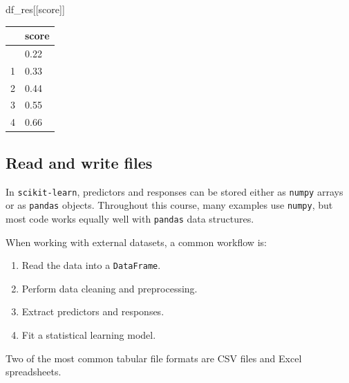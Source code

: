 \documentclass[
  letterpaper,
  DIV=11,
  numbers=noendperiod]{scrreprt}
\newenvironment{Shaded}{\begin{snugshade}}{\end{snugshade}}
\newcommand{\NormalTok}[1]{\textcolor[rgb]{0.00,0.23,0.31}{#1}}
\newcommand{\StringTok}[1]{\textcolor[rgb]{0.13,0.47,0.30}{#1}}
\newcounter{none} %
\providecommand{\tightlist}{%
  \setlength{\itemsep}{0pt}\setlength{\parskip}{0pt}}
\theoremstyle{definition}
\theoremstyle{definition}
\theoremstyle{plain}
\theoremstyle{plain}
\theoremstyle{remark}
\begin{document}
\begin{Shaded}
\begin{Highlighting}[]
\NormalTok{df\_res[[}\StringTok{\textquotesingle{}score\textquotesingle{}}\NormalTok{]]}
\end{Highlighting}
\end{Shaded}

{\def\LTcaptype{none} %
\begin{longtable}[]{@{}ll@{}}
\toprule\noalign{}
& score \\
\midrule\noalign{}
\endhead
\bottomrule\noalign{}
\endlastfoot
0 & 0.22 \\
1 & 0.33 \\
2 & 0.44 \\
3 & 0.55 \\
4 & 0.66 \\
\end{longtable}
}

\subsection{Read and write files}\label{read-and-write-files}

In \texttt{scikit-learn}, predictors and responses can be stored either
as \texttt{numpy} arrays or as \texttt{pandas} objects. Throughout this
course, many examples use \texttt{numpy}, but most code works equally
well with \texttt{pandas} data structures.

When working with external datasets, a common workflow is:

\begin{enumerate}
\def\labelenumi{\arabic{enumi}.}
\tightlist
\item
  Read the data into a \texttt{DataFrame}.
\item
  Perform data cleaning and preprocessing.
\item
  Extract predictors and responses.
\item
  Fit a statistical learning model.
\end{enumerate}

Two of the most common tabular file formats are CSV files and Excel
spreadsheets.
\end{document}
